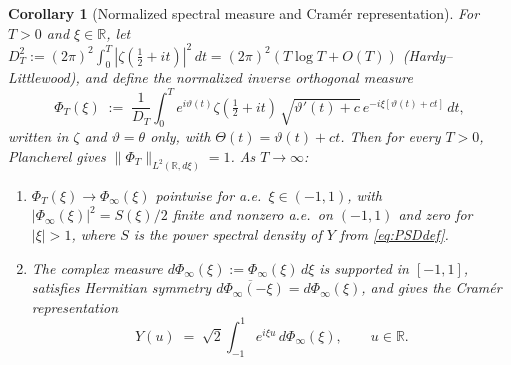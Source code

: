 \documentclass[11pt]{article}
\newtheorem{corollary}{Corollary}
\begin{document}
\begin{corollary}[Normalized spectral measure and Cram\'er representation]\label{cor:cramer}
For $T>0$ and $\xi\in\mathbb R$, let $D_T^{2}:=(2\pi)^{2}\int_{0}^{T}|\zeta(\tfrac12+it)|^{2}\,dt=(2\pi)^{2}(T\log T+O(T))$ (Hardy--Littlewood), and define the \emph{normalized inverse orthogonal measure}
\begin{equation}\label{eq:PhiT}
\Phi_T(\xi)\;:=\;\frac{1}{D_T}\int_{0}^{T} e^{i\vartheta(t)}\zeta(\tfrac12+it)\,\sqrt{\vartheta'(t)+c}\,e^{-i\xi[\vartheta(t)+ct]}\,dt,
\end{equation}
written in $\zeta$ and $\vartheta=\theta$ only, with $\Theta(t)=\vartheta(t)+ct$. Then for every $T>0$, Plancherel gives $\|\Phi_T\|_{L^{2}(\mathbb R,d\xi)}=1$. As $T\to\infty$:
\begin{enumerate}[label=\textnormal{(\roman*)},leftmargin=*]
\item $\Phi_T(\xi)\to\Phi_\infty(\xi)$ pointwise for a.e.\ $\xi\in(-1,1)$, with $|\Phi_\infty(\xi)|^{2}=S(\xi)/2$ finite and nonzero a.e.\ on $(-1,1)$ and zero for $|\xi|>1$, where $S$ is the power spectral density of $Y$ from \eqref{eq:PSDdef}.
\item The complex measure $d\Phi_\infty(\xi):=\Phi_\infty(\xi)\,d\xi$ is supported in $[-1,1]$, satisfies Hermitian symmetry $\overline{d\Phi_\infty(-\xi)}=d\Phi_\infty(\xi)$, and gives the Cram\'er representation
\begin{equation}\label{eq:CramerRep}
Y(u)\;=\;\sqrt{2}\int_{-1}^{1}e^{i\xi u}\,d\Phi_\infty(\xi),\qquad u\in\mathbb R.
\end{equation}
\end{enumerate}
\end{corollary}
\end{document}

